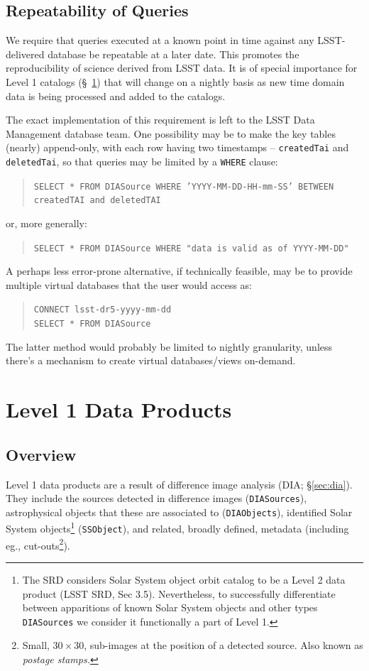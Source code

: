 \documentclass[12pt]{article}
\newcommand{\code}[1]{\texttt{#1}}
\newcommand{\DIASources}{\code{DIASources}\xspace}
\newcommand{\DIAObjects}{\code{DIAObjects}\xspace}
\newcommand{\SSObject}{\code{SSObject}\xspace}
\begin{document}
\subsection{Repeatability of Queries}

We require that queries executed at a known point in time against any LSST-delivered database be repeatable at a later date. This promotes the reproducibility of science derived from LSST data. It is of special importance for Level 1 catalogs (\S~\ref{sec:level1}) that will change on a nightly basis as new time domain data is being processed and added to the catalogs.

The exact implementation of this requirement is left to the LSST Data Management database team. One possibility may be to make the key tables (nearly) append-only, with each row having two timestamps -- {\tt createdTai} and {\tt deletedTai}, so that queries may be limited by a \code{WHERE} clause:
%
\begin{quote}
\texttt{SELECT * FROM DIASource WHERE 'YYYY-MM-DD-HH-mm-SS' BETWEEN createdTAI and deletedTAI}
\end{quote}
%
or, more generally:
%
\begin{quote}
\code{SELECT * FROM DIASource WHERE "data is valid as of YYYY-MM-DD"}
\end{quote}

A perhaps less error-prone alternative, if technically feasible, may be to provide multiple virtual databases that the user would access as:
%
\begin{quote}
\texttt{CONNECT lsst-dr5-yyyy-mm-dd} \\
\texttt{SELECT * FROM DIASource}
\end{quote}
%
The latter method would probably be limited to nightly granularity, unless there's a mechanism to create virtual databases/views on-demand.

\clearpage

\section{Level 1 Data Products}
\label{sec:level1}

\subsection{Overview}

Level 1 data products are a result of difference image analysis (DIA; \S \ref{sec:dia}). They include the sources detected in difference images (\DIASources), astrophysical objects that these are associated to (\DIAObjects), identified Solar System objects\footnote{The SRD considers Solar System object orbit catalog to be a Level 2 data product (LSST SRD, Sec 3.5). Nevertheless, to successfully differentiate between apparitions of known Solar System objects and other types \DIASources we consider it functionally a part of Level 1.} (\SSObject), and related, broadly defined, metadata (including eg., cut-outs\footnote{Small, $30 \times 30$, sub-images at the position of a detected source. Also known as {\em postage stamps.}}).
\end{document}
